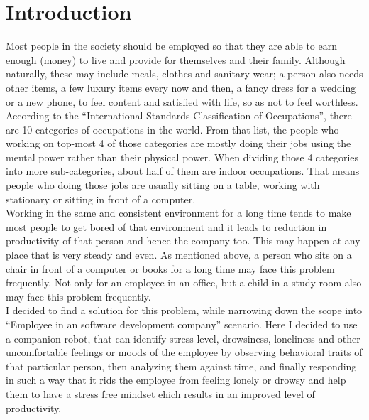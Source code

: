 \documentclass{article}
\begin{document}
	
	
	\tableofcontents
	\newpage

	\section{Introduction}
	Most people in the society should be employed so that they are able to earn enough (money) to live and provide for themselves and their family. Although naturally, these may include meals, clothes and sanitary wear; a person also needs other items, a few luxury items every now and then, a fancy dress for a wedding or a new phone, to feel content and satisfied with life, so as not to feel worthless.\\
	
	\indent According to the ``International Standards Classification of Occupations\cite{iscoDefinition}'', there are 10 categories of occupations in the world. From that list, the people who working on top-most 4 of those categories are mostly doing their jobs using the mental power rather than their physical power. When dividing those 4 categories into more sub-categories, about half of them are indoor occupations. That means people who doing those jobs are usually sitting on a table, working with stationary or sitting in front of a computer.\\
	
	\indent Working in the same and consistent environment for a long time tends to make most people to get bored of that environment\cite{workingEnvironmentBoredom} and it leads to reduction in productivity of that person and hence the company too. This may happen at any place that is very steady and even. As mentioned above, a person who sits on a chair in front of a computer or books for a long time may face this problem frequently. Not only for an employee in an office, but a child in a study room also may face this problem frequently.\\
	
	\indent I decided to find a solution for this problem, while narrowing down the scope into “Employee in an software development company” scenario. Here I decided to use a companion robot, that can identify stress level, drowsiness, loneliness and other uncomfortable feelings or moods of the employee by observing behavioral traits of that particular person, then analyzing them against time, and finally responding in such a way that it rids the employee from feeling lonely or drowsy and help them to have a stress free mindset ehich results in an improved level of productivity.
	
\end{document}
